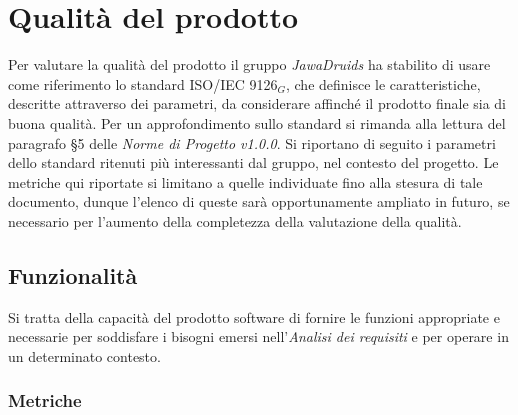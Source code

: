 \chapter{Qualità del prodotto} \label{QualitàDelProdotto}

Per valutare la qualità del prodotto il gruppo \textit{JawaDruids} ha stabilito di usare come riferimento lo standard ISO/IEC 9126$_G$, che definisce le caratteristiche, descritte attraverso dei parametri,  da considerare affinché il prodotto finale sia di buona qualità. 
Per un approfondimento sullo standard si rimanda alla lettura del paragrafo §5 delle \textit{Norme di Progetto v1.0.0}. 
Si riportano di seguito i parametri dello standard ritenuti più interessanti dal gruppo, nel contesto del  progetto.
Le metriche qui riportate si limitano a quelle individuate fino alla stesura di tale documento, dunque l’elenco di queste sarà opportunamente ampliato in futuro, se necessario per l’aumento della completezza della valutazione della qualità.

\section{Funzionalità} \label{QualitàDelProdottoFunzionalità}
Si tratta della capacità del prodotto software di fornire le funzioni appropriate e necessarie per soddisfare i bisogni emersi nell’\textit{Analisi dei requisiti} e per operare in un determinato contesto. 
\subsection{Metriche} \label{QualitàDelProdottoFunzionalitàMetriche}
